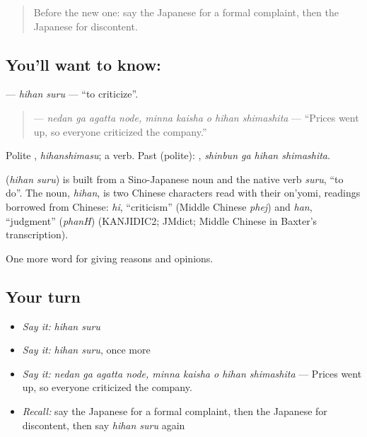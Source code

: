 \label{lesson:JA-C324-hihan-suru}



\begin{quote}
Before the new one: say the Japanese for a formal complaint, then the Japanese for discontent.
\end{quote}

\subsection*{You'll want to know: }
\textbf{} — \emph{hihan suru} — \textquotedblleft{}to criticize\textquotedblright{}.

\begin{quote}
\textbf{   } — \emph{nedan ga agatta node, minna kaisha o hihan shimashita} — \textquotedblleft{}Prices went up, so everyone criticized the company.\textquotedblright{}
\end{quote}

Polite \textbf{}, \emph{hihanshimasu}; a  verb. Past (polite): \textbf{ }, \emph{shinbun ga hihan shimashita}.

\begin{cousinweb}
\textbf{} (\emph{hihan suru}) is built from a Sino-Japanese noun and the native verb \emph{suru}, \textquotedblleft{}to do\textquotedblright{}. The noun, \emph{hihan}, is two Chinese characters read with their on'yomi, readings borrowed from Chinese: \emph{hi}, \textquotedblleft{}criticism\textquotedblright{} (Middle Chinese \emph{phej}) and \emph{han}, \textquotedblleft{}judgment\textquotedblright{} (\emph{phanH}) (KANJIDIC2; JMdict; Middle Chinese in Baxter's transcription).
\end{cousinweb}

\begin{grammarlens}[title={What you've built}]
One more word for giving reasons and opinions.
\end{grammarlens}

\subsection*{Your turn}
\begin{itemize}
\raggedright
  \item \emph{Say it:} \emph{hihan suru}
  \item \emph{Say it:} \emph{hihan suru}, once more
  \item \emph{Say it:} \emph{nedan ga agatta node, minna kaisha o hihan shimashita} — Prices went up, so everyone criticized the company.
  \item \emph{Recall:} say the Japanese for a formal complaint, then the Japanese for discontent, then say \emph{hihan suru} again
\end{itemize}

